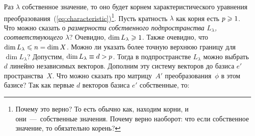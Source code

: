 \documentclass[a4paper,12pt]{article}
\begin{document}
  Раз $\lambda$ собственное значение, то оно будет корнем характеристического уравнения преобразования~(\ref{eq:characteristic})\footnote{Почему это верно? То есть обычно как, находим корни, и они~---~собственные значения. Почему верно наоборот: что если собственное значение, то обязательно корень?}.
  Пусть кратность $\lambda$ как корня есть $p \hm\geq 1$.
  Что можно сказать о \emph{размерности собственного подпространства $L_{\lambda}$, соответствующего $\lambda$}?
  Очевидно, $\dim L_{\lambda} \hm\geq 1$.
  Также очевидно, что $\dim L_{\lambda} \hm\leq n \hm= \dim X$.
  Можно ли указать более точную верхнюю границу для $\dim L_{\lambda}$?
  Допустим, $\dim L_{\lambda} \hm\equiv d \hm> p$.
  Тогда в подпространстве $L_{\lambda}$ можно выбрать $d$ линейно независимых векторов.
  Дополним эту систему векторов до базиса $e'$ пространства~$X$.
  Что можно сказать про матрицу~$A'$ преобразования~$\phi$ в этом базисе?
  Так как первые $d$ векторов базиса $e'$ собственные, то:
\end{document}
